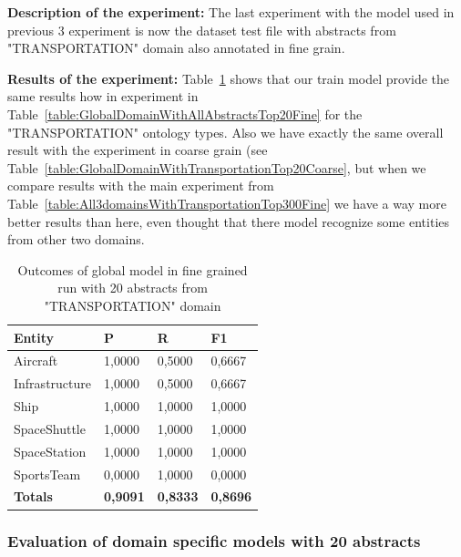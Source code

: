 \documentclass[thesis=M,english]{FITthesis}[2018/05/30]
\begin{document}
\textbf{Description of the experiment:} The last experiment with the model used in previous 3 experiment is now the dataset test file with abstracts from "TRANSPORTATION" domain also annotated in fine grain.

\textbf{Results of the experiment:} Table~\ref{table:GlobalDomainWithTransportationTop20Fine} shows that our train model provide the same results how in experiment in Table~\ref{table:GlobalDomainWithAllAbstractsTop20Fine} for the "TRANSPORTATION" ontology types. Also we have exactly the same overall result with the experiment in coarse grain (see Table~\ref{table:GlobalDomainWithTransportationTop20Coarse}, but when we compare results with the main experiment from Table~\ref{table:All3domainsWithTransportationTop300Fine} we have a way more better results than here, even thought that there model recognize some entities from other two domains.

	\begin{table}[H]\centering
		\begin{tabular}{|l|l|l|l|}
			\hline {\textbf{Entity}} & {\textbf{P}} & {\textbf{R}} & {\textbf{F1}}\\\hline
				Aircraft & 1,0000 & 0,5000 & 0,6667\\
				Infrastructure & 1,0000 & 0,5000 & 0,6667\\
				Ship & 1,0000 & 1,0000 & 1,0000\\				
				SpaceShuttle & 1,0000 & 1,0000 & 1,0000\\
				SpaceStation & 1,0000 & 1,0000 & 1,0000\\
				SportsTeam & 0,0000 & 1,0000 & 0,0000\\\hline
				\textbf{Totals} & \textbf{0,9091} & \textbf{0,8333} & \textbf{0,8696}\\\hline
		\end{tabular}
		\caption{Outcomes of global model in fine grained run with 20 abstracts from "TRANSPORTATION" domain \label{table:GlobalDomainWithTransportationTop20Fine}}		
	\end{table}


\subsubsection{Evaluation of domain specific models with 20 abstracts}
\end{document}
